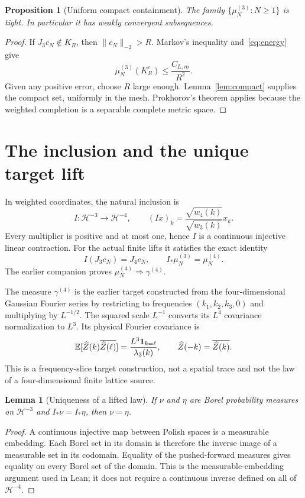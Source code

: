 \documentclass[11pt]{amsart}
\newtheorem{lemma}[theorem]{Lemma}
\newtheorem{proposition}[theorem]{Proposition}
\theoremstyle{remark}\newtheorem{remark}[theorem]{Remark}
\newcommand{\HH}[1]{\mathcal H^{-#1}}
\newcommand{\norm}[1]{\lVert#1\rVert}
\begin{document}
\begin{proposition}[Uniform compact containment]\label{prop:tight}
The family $\{\mu_N^{(3)}:N\geq1\}$ is tight. In particular it has weakly convergent subsequences.
\end{proposition}
\begin{proof}
If $J_3c_N\notin K_R$, then $\norm{c_N}_{-2}>R$. Markov's inequality and~\eqref{eq:energy} give
\[
 \mu_N^{(3)}(K_R^c)\leq \frac{C_{L,m}}{R^2}.
\]
Given any positive error, choose $R$ large enough. Lemma~\ref{lem:compact} supplies the compact set, uniformly in the mesh. Prokhorov's theorem applies because the weighted completion is a separable complete metric space.
\end{proof}

\section{The inclusion and the unique target lift}
In weighted coordinates, the natural inclusion is
\begin{equation}\label{eq:inclusion}
 I:\HH{3}\longrightarrow\HH{4},\qquad
 (Ix)_k=\frac{\sqrt{w_4(k)}}{\sqrt{w_3(k)}}x_k.
\end{equation}
Every multiplier is positive and at most one, hence $I$ is a continuous injective linear contraction. For the actual finite lifts it satisfies the exact identity
\[
 I(J_3c_N)=J_4c_N,\qquad I_*\mu_N^{(3)}=\mu_N^{(4)}.
\]
The earlier companion proves $\mu_N^{(4)}\Longrightarrow\gamma^{(4)}$.

The measure $\gamma^{(4)}$ is the earlier target constructed from the four-dimensional Gaussian Fourier series by restricting to frequencies $(k_1,k_2,k_3,0)$ and multiplying by $L^{-1/2}$. The squared scale $L^{-1}$ converts its $L^4$ covariance normalization to $L^3$. Its physical Fourier covariance is
\[
 \mathbb E[\widehat Z(k)\overline{\widehat Z(\ell)}]
 =\frac{L^3\mathbf1_{k=\ell}}{\lambda_3(k)},\qquad
 \widehat Z(-k)=\overline{\widehat Z(k)}.
\]
This is a frequency-slice target construction, not a spatial trace and not the law of a four-dimensional finite lattice source.

\begin{lemma}[Uniqueness of a lifted law]\label{lem:embedding}
If $\nu$ and $\eta$ are Borel probability measures on $\HH{3}$ and $I_*\nu=I_*\eta$, then $\nu=\eta$.
\end{lemma}
\begin{proof}
A continuous injective map between Polish spaces is a measurable embedding. Each Borel set in its domain is therefore the inverse image of a measurable set in its codomain. Equality of the pushed-forward measures gives equality on every Borel set of the domain. This is the measurable-embedding argument used in Lean; it does not require a continuous inverse defined on all of $\HH{4}$.
\end{proof}
\end{document}
